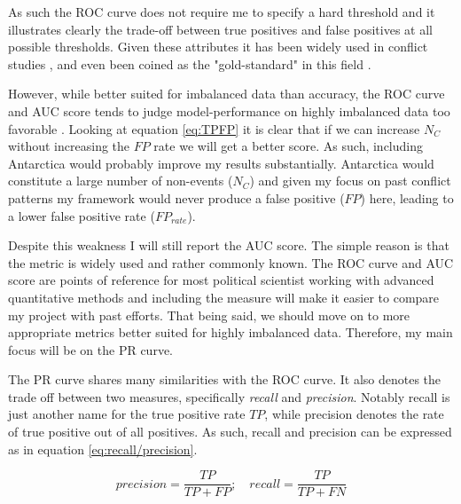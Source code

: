 \documentclass[a4paper]{article}
\begin{document}
As such the ROC curve does not require me to specify a hard threshold and it illustrates clearly the trade-off between true positives and false positives at all possible thresholds. Given these attributes it has been widely used in conflict studies \citep[14]{chadefaux2017conflict}, and even been coined as the "gold-standard" in this field \citep[366]{perry_2013}. 

However, while better suited for imbalanced data than accuracy, the ROC curve and AUC score tends to judge model-performance on highly imbalanced data too favorable \citep[1278]{He_2008}. Looking at equation \ref{eq:TPFP} it is clear that if we can increase $N_C$ without increasing the $FP$ rate we will get a better score. As such, including Antarctica would probably improve my results substantially. Antarctica would constitute a large number of non-events ($N_C$) and given my focus on past conflict patterns my framework would never produce a false positive ($FP$) here, leading to a lower false positive rate ($FP_{rate}$).\par

Despite this weakness I will still report the AUC score. The simple reason is that the metric is widely used and rather commonly known. The ROC curve and AUC score are points of reference for most political scientist working with advanced quantitative methods and including the measure will make it easier to compare my project with past efforts. That being said, we should move on to more appropriate metrics better suited for highly imbalanced data. Therefore, my main focus will be on the PR curve.\par

The PR curve shares many similarities with the ROC curve. It also denotes the trade off between two measures, specifically \emph{recall} and \emph{precision}. Notably recall is just another name for the true positive rate $TP$, while precision denotes the rate of true positive out of all positives. As such, recall and
precision can be expressed as in equation \ref{eq:recall/precision}.\par%

\[
precision = \frac{TP}{TP+FP}; \quad recall = \frac{TP}{TP+FN} \tag{16} \label{eq:recall/precision}
\]

\end{document}
